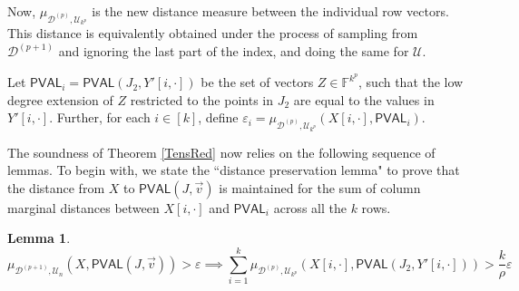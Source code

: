 \documentclass[11pt]{article}
\newtheorem{lemma}[theorem]{Lemma}
\newcommand{\PVAL}{\mathsf{PVAL}}
\begin{document}
Now, $\mu_{\mathcal{D}^{(p)}, \mathcal{U}_{k^{p}}}$ is the new distance measure between the individual row vectors. This distance is equivalently obtained under the process of sampling from $\mathcal{D}^{(p+1)}$ and ignoring the last part of the index, and doing the same for $\mathcal{U}$.


Let $\PVAL_{i}=\PVAL(J_{2},Y'[i,\cdot])$ be the set of vectors $Z\in\mathbb{F}^{k^{p}}$, such that the low degree extension of $Z$ restricted to the points in $J_{2}$ are equal to the values in $Y'[i,\cdot]$. Further, for each $i \in [k]$, define $\varepsilon_{i}=\mu_{\mathcal{D}^{(p)}, \mathcal{U}_{k^{p}}}(X[i,\cdot],\PVAL_{i})$.

The soundness of Theorem \ref{TensRed} now relies on the following sequence of lemmas. To begin with, we state the ``distance preservation lemma" to prove that the distance from $X$ to $\PVAL(J,\Vec{v})$ is maintained for the sum of column marginal distances between $X[i,\cdot]$ and $\PVAL_i$ across all the $k$ rows.

\begin{lemma}
\label{epsilons}
\begin{equation*}
    \mu_{\mathcal{D}^{(p+1)}, \mathcal{U}_{n}}(X,\PVAL(J,\vec{v}))>\varepsilon\implies \sum_{i=1}^{k}\mu_{\mathcal{D}^{(p)}, \mathcal{U}_{k^{p}}}(X[i,\cdot],\PVAL(J_{2}, Y'[i,\cdot]))>\frac{k}{\rho}\varepsilon
\end{equation*}
\end{lemma}
\end{document}
